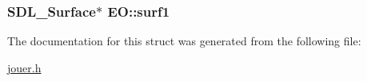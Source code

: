 \subsubsection[{\texorpdfstring{surf1}{surf1}}]{\setlength{\rightskip}{0pt plus 5cm}S\+D\+L\+\_\+\+Surface$\ast$ E\+O\+::surf1}\hypertarget{structEO_ad31ed54635cf3fe538735cad72b6b193}{}\label{structEO_ad31ed54635cf3fe538735cad72b6b193}


The documentation for this struct was generated from the following file\+:\begin{DoxyCompactItemize}
\item 
\hyperlink{jouer_8h}{jouer.\+h}\end{DoxyCompactItemize}
